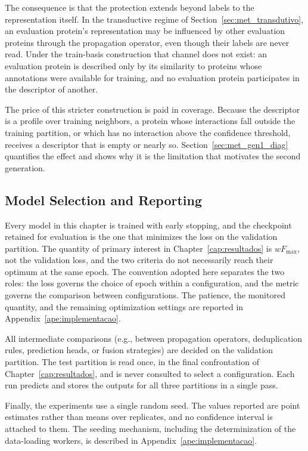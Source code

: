 \documentclass[Ingles]{ic-tese-v3}
\begin{document}
The consequence is that the protection extends beyond labels to the representation itself. In the
transductive regime of Section~\ref{sec:met_transdutivo}, an evaluation protein's representation may
be influenced by other evaluation proteins through the propagation operator, even though their
labels are never read. Under the train-basis construction that channel does not exist: an evaluation
protein is described only by its similarity to proteins whose annotations were available for
training, and no evaluation protein participates in the descriptor of another.

The price of this stricter construction is paid in coverage. Because the descriptor is a profile
over training neighbors, a protein whose interactions fall outside the training partition, or
which has no interaction above the confidence threshold, receives a descriptor that is
empty or nearly so. Section~\ref{sec:met_gen1_diag} quantifies the effect and shows why it is the
limitation that motivates the second generation.

\subsection{Model Selection and Reporting}
\label{sec:met_selecao}

Every model in this chapter is trained with early stopping, and the checkpoint retained for
evaluation is the one that minimizes the loss on the validation partition. The quantity of primary
interest in Chapter~\ref{cap:resultados} is $wF_{\max}$, not the validation loss, and
the two criteria do not necessarily reach their optimum at the same epoch. The convention adopted
here separates the two roles: the loss governs the choice of epoch within a configuration, and the
metric governs the comparison between configurations. The patience, the monitored quantity, and the
remaining optimization settings are reported in Appendix~\ref{ape:implementacao}.

All intermediate comparisons (e.g., between propagation operators, deduplication rules, prediction
heads, or fusion strategies) are decided on the validation partition. The test partition is read
once, in the final confrontation of Chapter~\ref{cap:resultados}, and is never consulted to select
a configuration. Each run predicts and stores the outputs for all three partitions in a single pass.

Finally, the experiments use a single random seed. The values reported are point estimates rather
than means over replicates, and no confidence interval is attached to them. The seeding mechanism,
including the determinization of the data-loading workers, is described in
Appendix~\ref{ape:implementacao}.
\end{document}
